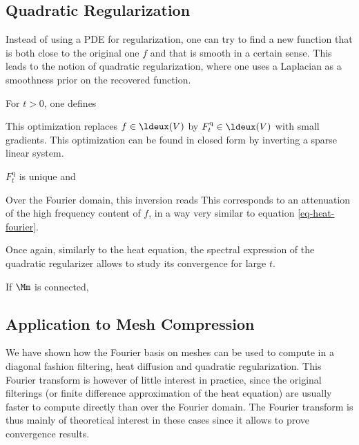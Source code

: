 \subsection{Quadratic Regularization}

Instead of using a PDE for regularization, one can try to find a new function that is both close to the original one $f$ and that is smooth in a certain sense.  This leads to the notion of quadratic regularization, where one uses a Laplacian as a smoothness prior on the recovered function.

\begin{defn} For $t>0$, one defines
\end{defn}

This optimization replaces $f \in \ldeux(V)$ by $F_t^{\text{q}} \in \ldeux(V)$ with small gradients. This optimization can be found in closed form by inverting a sparse linear system.

\begin{thm} $F_t^{\text{q}}$ is unique and
\end{thm}

Over the Fourier domain, this inversion reads
This corresponds to an attenuation of the high frequency content of $f$, in a way very similar to equation \eqref{eq-heat-fourier}.

Once again, similarly to the heat equation, the spectral expression of the quadratic regularizer allows to study its convergence for large $t$.

\begin{thm} If $\Mm$ is connected, 
\end{thm}

\subsection{Application to Mesh Compression}

We have shown how the Fourier basis on meshes can be used to compute in a diagonal fashion filtering, heat diffusion and quadratic regularization. This Fourier transform is however of little interest in practice, since the original filterings (or finite difference approximation of the heat equation) are usually faster to compute directly than over the Fourier domain. The Fourier transform is thus mainly of theoretical interest in these cases since it allows to prove convergence results.

